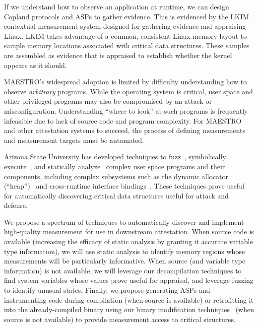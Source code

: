 \documentclass[runningheads]{llncs}
\begin{document}
If we understand how to observe an application at runtime, we can
design Copland protocols and ASPs to gather evidence.  This is
evidenced by the LKIM~\cite{Loscocco:07:Linux-kernel-in} contextual
measurement system designed for gathering evidence and appraising
Linux.  LKIM takes advantage of a common, consistent Linux memory
layout to sample memory locations associated with critical data
structures.  These samples are assembled as evidence that is appraised
to establish whether the kernel appears as it should.

MAESTRO's widespread adoption is limited by difficulty understanding
how to observe \emph{arbitrary} programs.  While the operating system is
critical, user space and other privileged programs may also be compromised
by an attack or misconfiguration.  Understanding ``where to look'' at
such programs is frequently infeasible due to lack of source
code and program complexity.  For MAESTRO and other attestation
systems to succeed, the process of defining measurements and
measurement targets must be automated.

Arizona State University has developed
techniques to fuzz~\cite{trickel2022toss,salls2020exploring,peng2018t}, symbolically execute~\cite{stephens2016driller,shoshitaishvili2016sok}, and statically analyze~\cite{das2022hybrid,vadayath2022arbiter} complex user space programs and their components, including complex subsystems such as the dynamic allocator (``heap'')~\cite{eckert2018heaphopper} and cross-runtime interface bindings~\cite{dinh2021favocado}.
These techniques prove useful for automatically discovering critical data structures useful for attack and defense.

We propose a spectrum of techniques to automatically discover and
implement high-quality measurement for use in downstream attestation.
When source code is available (increasing the efficacy of static analysis by granting it accurate variable type information), we will use static analysis to identify memory regions whose measurements will be particularly informative.
When source (and variable type information) is not available, we will leverage our decompilation techniques to find system variables whose values prove useful for appraisal, and leverage fuzzing to identify unusual states.
Finally, we propose generating ASPs and instrumenting code during compilation (when source is available) or retrofitting it into the already-compiled binary using our binary modification techniques~\cite{wang2017ramblr} (when source is not available) to provide measurement access to critical structures.
\end{document}

